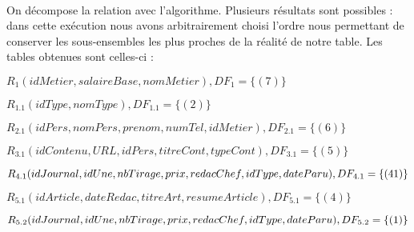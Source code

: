\paragraph{}{
On décompose la relation avec l'algorithme. Plusieurs résultats sont possibles : dans cette exécution nous avons arbitrairement choisi l'ordre nous permettant de conserver les sous-ensembles les plus proches de la réalité de notre table.
Les tables obtenues sont celles-ci :

$R_1(idMetier, salaireBase, nomMetier), DF_1=\{(7)\}$

$R_{1.1}(idType, nomType), DF_{1.1}=\{(2)\}$

$R_{2.1}(idPers, nomPers, prenom, numTel, idMetier), DF_{2.1}=\{(6)\}$

$R_{3.1}(idContenu, URL, idPers, titreCont, typeCont), DF_{3.1}=\{(5)\}$

$R_{4.1}(idJournal, idUne, nbTirage, prix, redacChef, idType, dateParu), \\DF_{4.1}=\{(41)\}$

$R_{5.1}(idArticle, dateRedac, titreArt, resumeArticle), DF_{5.1}=\{(4)\}$

$R_{5.2}(idJournal, idUne, nbTirage, prix, redacChef, idType, dateParu), \\DF_{5.2}=\{(1)\}$
}
